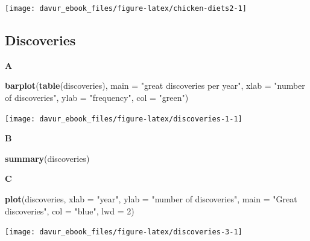 \documentclass[]{book}
\newenvironment{Shaded}{\begin{snugshade}}{\end{snugshade}}
\newcommand{\DataTypeTok}[1]{\textcolor[rgb]{0.13,0.29,0.53}{#1}}
\newcommand{\DecValTok}[1]{\textcolor[rgb]{0.00,0.00,0.81}{#1}}
\newcommand{\KeywordTok}[1]{\textcolor[rgb]{0.13,0.29,0.53}{\textbf{#1}}}
\newcommand{\NormalTok}[1]{#1}
\newcommand{\StringTok}[1]{\textcolor[rgb]{0.31,0.60,0.02}{#1}}
\begin{document}
\begin{center}\texttt{[image: davur\_ebook\_files/figure-latex/chicken-diets2-1]} \end{center}

\hypertarget{discoveries-1}{%
\subsection{Discoveries}\label{discoveries-1}}

\textbf{A}

\begin{Shaded}
\begin{Highlighting}[]
\KeywordTok{barplot}\NormalTok{(}\KeywordTok{table}\NormalTok{(discoveries),}
    \DataTypeTok{main =} \StringTok{"great discoveries per year"}\NormalTok{,}
    \DataTypeTok{xlab =} \StringTok{"number of discoveries"}\NormalTok{,}
    \DataTypeTok{ylab =} \StringTok{"frequency"}\NormalTok{,}
    \DataTypeTok{col =} \StringTok{"green"}\NormalTok{)}
\end{Highlighting}
\end{Shaded}

\begin{center}\texttt{[image: davur\_ebook\_files/figure-latex/discoveries-1-1]} \end{center}

\textbf{B}

\begin{Shaded}
\begin{Highlighting}[]
\KeywordTok{summary}\NormalTok{(discoveries)}
\end{Highlighting}
\end{Shaded}

\textbf{C}

\begin{Shaded}
\begin{Highlighting}[]
\KeywordTok{plot}\NormalTok{(discoveries,}
         \DataTypeTok{xlab =} \StringTok{"year"}\NormalTok{,}
         \DataTypeTok{ylab =} \StringTok{"number of discoveries"}\NormalTok{,}
         \DataTypeTok{main =} \StringTok{"Great discoveries"}\NormalTok{,}
         \DataTypeTok{col =} \StringTok{"blue"}\NormalTok{, }
         \DataTypeTok{lwd =} \DecValTok{2}\NormalTok{)}
\end{Highlighting}
\end{Shaded}

\begin{center}\texttt{[image: davur\_ebook\_files/figure-latex/discoveries-3-1]} \end{center}
\end{document}

